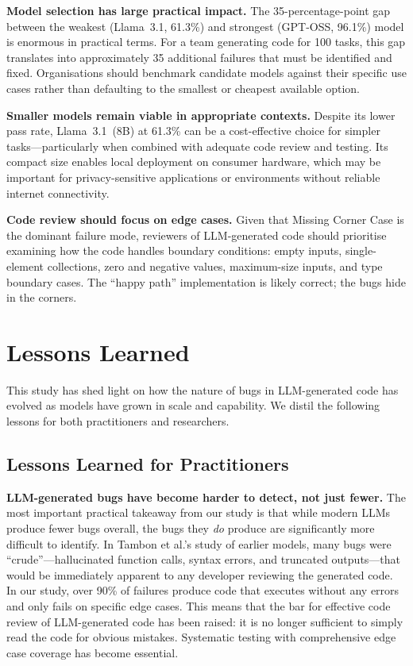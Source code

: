 \documentclass[smallextended]{svjour3}
\begin{document}
\textbf{Model selection has large practical impact.} The 35-percentage-point gap between the weakest (Llama~3.1, 61.3\%) and strongest (GPT-OSS, 96.1\%) model is enormous in practical terms. For a team generating code for 100 tasks, this gap translates into approximately 35 additional failures that must be identified and fixed. Organisations should benchmark candidate models against their specific use cases rather than defaulting to the smallest or cheapest available option.

\textbf{Smaller models remain viable in appropriate contexts.} Despite its lower pass rate, Llama~3.1~(8B) at 61.3\% can be a cost-effective choice for simpler tasks---particularly when combined with adequate code review and testing. Its compact size enables local deployment on consumer hardware, which may be important for privacy-sensitive applications or environments without reliable internet connectivity.

\textbf{Code review should focus on edge cases.} Given that Missing Corner Case is the dominant failure mode, reviewers of LLM-generated code should prioritise examining how the code handles boundary conditions: empty inputs, single-element collections, zero and negative values, maximum-size inputs, and type boundary cases. The ``happy path'' implementation is likely correct; the bugs hide in the corners.

\section{Lessons Learned}
\label{sec:lessons}

This study has shed light on how the nature of bugs in LLM-generated code has evolved as models have grown in scale and capability. We distil the following lessons for both practitioners and researchers.

\subsection{Lessons Learned for Practitioners}

\textbf{LLM-generated bugs have become harder to detect, not just fewer.} The most important practical takeaway from our study is that while modern LLMs produce fewer bugs overall, the bugs they \emph{do} produce are significantly more difficult to identify. In Tambon et al.'s study of earlier models, many bugs were ``crude''---hallucinated function calls, syntax errors, and truncated outputs---that would be immediately apparent to any developer reviewing the generated code. In our study, over 90\% of failures produce code that executes without any errors and only fails on specific edge cases. This means that the bar for effective code review of LLM-generated code has been raised: it is no longer sufficient to simply read the code for obvious mistakes. Systematic testing with comprehensive edge case coverage has become essential.
\end{document}
